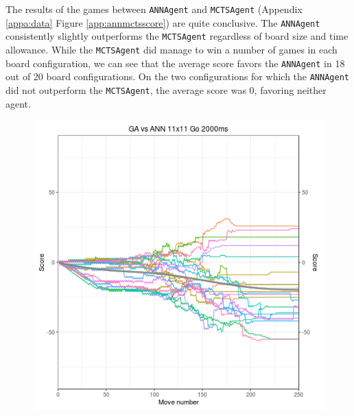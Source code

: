 The results of the games between \texttt{ANNAgent} and \texttt{MCTSAgent} (Appendix \ref{appa:data} Figure \ref{app:annmctsscore}) are quite conclusive.  The \texttt{ANNAgent} consistently slightly outperforms the \texttt{MCTSAgent} regardless of board size and time allowance.  While the \texttt{MCTSAgent} did manage to win a number of games in each board configuration, we can see that the average score favors the \texttt{ANNAgent} in 18 out of 20 board configurations.  On the two configurations for which the \texttt{ANNAgent} did not outperform the \texttt{MCTSAgent}, the average score was 0, favoring neither agent.

\begin{figure}[h]
\centering
\begin{minipage}{.45\textwidth}
  \centering
  \includegraphics[scale=0.4]{images/Visualizations/GAvsANN/2000ms11x11.png}
\end{minipage}%
\begin{minipage}{.45\textwidth}
  \centering

\end{minipage}
\end{figure}

